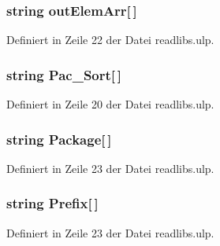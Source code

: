 \hypertarget{readlibs_8ulp_abd552ace971c34ee4d05fc524378dc32}{}
\subsubsection[{out\+Elem\+Arr}]{\setlength{\rightskip}{0pt plus 5cm}string out\+Elem\+Arr\mbox{[}$\,$\mbox{]}}\label{readlibs_8ulp_abd552ace971c34ee4d05fc524378dc32}


Definiert in Zeile 22 der Datei readlibs.\+ulp.

\hypertarget{readlibs_8ulp_a530865d3310688a7b794eea8ab03c60b}{}
\subsubsection[{Pac\+\_\+\+Sort}]{\setlength{\rightskip}{0pt plus 5cm}string Pac\+\_\+\+Sort\mbox{[}$\,$\mbox{]}}\label{readlibs_8ulp_a530865d3310688a7b794eea8ab03c60b}


Definiert in Zeile 20 der Datei readlibs.\+ulp.

\hypertarget{readlibs_8ulp_a36b57fe679881487796855a589fbfb85}{}
\subsubsection[{Package}]{\setlength{\rightskip}{0pt plus 5cm}string Package\mbox{[}$\,$\mbox{]}}\label{readlibs_8ulp_a36b57fe679881487796855a589fbfb85}


Definiert in Zeile 23 der Datei readlibs.\+ulp.

\hypertarget{readlibs_8ulp_aadcab157eddcbfbc94bcde5363c32934}{}
\subsubsection[{Prefix}]{\setlength{\rightskip}{0pt plus 5cm}string Prefix\mbox{[}$\,$\mbox{]}}\label{readlibs_8ulp_aadcab157eddcbfbc94bcde5363c32934}


Definiert in Zeile 23 der Datei readlibs.\+ulp.

\hypertarget{readlibs_8ulp_afdccf00f7f9b4c4daf90921260c72e92}{}
